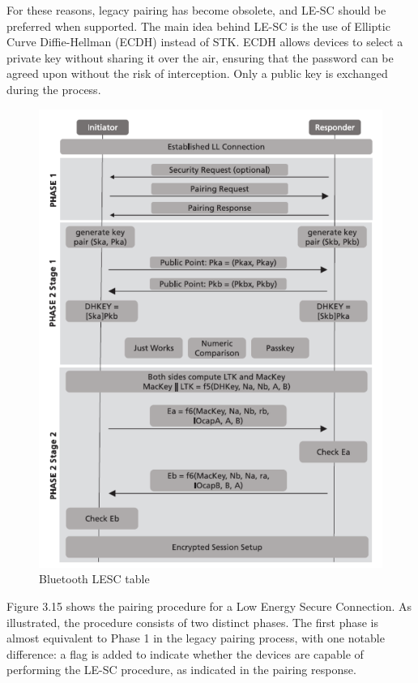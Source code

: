 \documentclass{Configuration_Files/PoliMi3i_thesis}
\begin{document}
For these reasons, legacy pairing has become obsolete, and LE-SC should be preferred when supported. The main idea behind LE-SC is the use of Elliptic Curve Diffie-Hellman (ECDH) instead of STK. ECDH allows devices to select a private key without sharing it over the air, ensuring that the password can be agreed upon without the risk of interception. Only a public key is exchanged during the process.

\begin{figure}[H]
    \centering
    \includegraphics[scale=0.7]{Bluetooth_Security/5.png}
    \caption{Bluetooth LESC table \cite{PairingProcess}}
    \label{bluetooth_sec_5}
\end{figure}

Figure 3.15 shows the pairing procedure for a Low Energy Secure Connection. As illustrated, the procedure consists of two distinct phases. The first phase is almost equivalent to Phase 1 in the legacy pairing process, with one notable difference: a flag is added to indicate whether the devices are capable of performing the LE-SC procedure, as indicated in the pairing response. 
\end{document}
